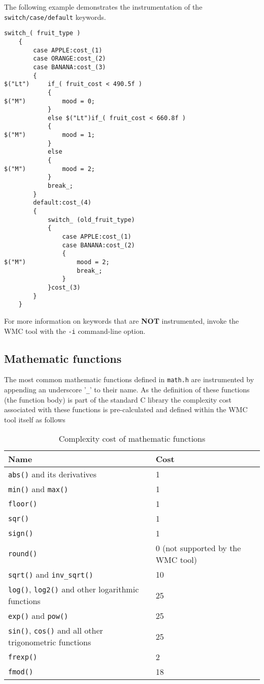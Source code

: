 The following example demonstrates the instrumentation of the \verb|switch/case/default| keywords.

\begin{Verbatim}[fontsize=\small]
    switch_( fruit_type )
    {
        case APPLE:cost_(1)
        case ORANGE:cost_(2)
        case BANANA:cost_(3)
        {
$("Lt")     if_( fruit_cost < 490.5f )
            {
$("M")          mood = 0;
            }
            else $("Lt")if_( fruit_cost < 660.8f )
            {
$("M")          mood = 1;
            }
            else
            {
$("M")          mood = 2;
            }
            break_;
        }
        default:cost_(4)
        {
            switch_ (old_fruit_type)
            {
                case APPLE:cost_(1)
                case BANANA:cost_(2)
                {
$("M")              mood = 2;
                    break_;
                }
            }cost_(3)
        }
    }
\end{Verbatim}

For more information on keywords that are \textbf{NOT} instrumented, invoke the WMC tool with the \verb|-i| command-line option.

\subsection{Mathematic functions}

The most common mathematic functions defined in \verb|math.h| are instrumented by appending an underscore '\verb|_|' to their name. As the definition of these functions (the function body) is part of the standard C library the complexity cost associated with these functions is pre-calculated and defined within the WMC tool itself as follows

\begin{table}[!hb]
\centering\small
\caption{Complexity cost of mathematic functions}
\begin{tabular}{|l|l|}
\hline
\textbf{Name} & \textbf{Cost} \\
\hline
\verb|abs()| and its derivatives & 1 \\
\verb|min()| and \verb|max()| & 1 \\
\verb|floor()| & 1 \\
\verb|sqr()| & 1 \\
\verb|sign()| & 1 \\
\verb|round()| & 0 (not supported by the WMC tool) \\
\verb|sqrt()| and \verb|inv_sqrt()| & 10 \\
\verb|log()|, \verb|log2()| and other logarithmic functions & 25 \\
\verb|exp()| and \verb|pow()| & 25 \\
\verb|sin()|, \verb|cos()| and all other trigonometric functions & 25 \\
\verb|frexp()| & 2 \\
\verb|fmod()| & 18 \\
\hline
\end{tabular}
\label{tab:cost_of_math_functions}
\end{table}


